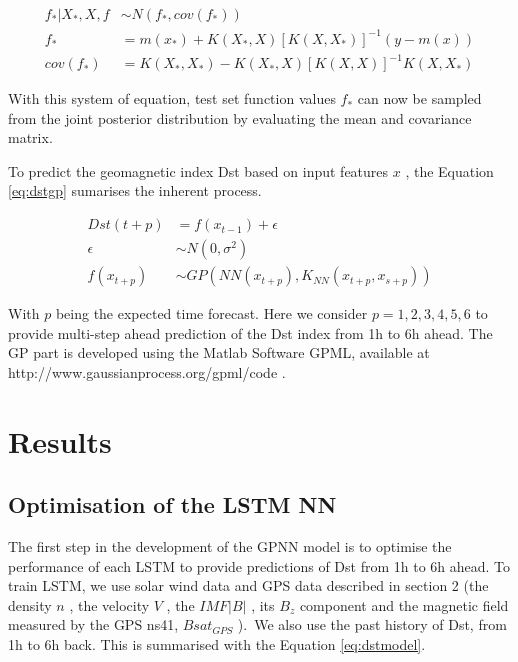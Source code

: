 \begin{align}\label{eq:preddist}
 f_{\ast} \vert X_{\ast},X,f &\sim N \left( f_{\ast},cov \left( f_{\ast} \right)  \right)  \\ 
 f_{\ast} &= m \left( x_{\ast} \right) +K \left( X_{\ast},X \right)  \left[ K \left( X,X_{\ast}  \right)  \right] ^{-1} \left( y-m \left( x \right)  \right) \\ 
 cov \left( f_{\ast} \right) &= K \left( X_{\ast},X_{\ast} \right) -K \left( X_{\ast},X \right)  \left[ K \left( X,X \right)  \right] ^{-1} K \left( X,X_{\ast} \right) 
\end{align}

With this system of equation, test set function values  \( f_{\ast} \)  can now be sampled from the joint 
posterior distribution by evaluating the mean and covariance matrix. 



To predict the geomagnetic index Dst based on input features \( x \) , the Equation \ref{eq:dstgp} sumarises 
the inherent process. 



\begin{align}\label{eq:dstgp}
Dst \left( t+p \right) &= f \left( x_{t-1} \right) + \epsilon \\ 
\epsilon &\sim N \left( 0, \sigma ^{2} \right)  \\
f \left( x_{t+p} \right)  &\sim GP \left( NN \left( x_{t+p} \right) , K_{NN}(x_{t+p}, x_{s+p} ) \right)
\end{align}

With  \( p \)  being the expected time forecast. Here we 
consider $p  = {1,2,3,4,5,6}$ to provide multi-step ahead prediction 
of the Dst index from 1h to 6h ahead. The GP part is developed using the Matlab Software GPML, available 
at http://www.gaussianprocess.org/gpml/code \cite{rasmussen2010gaussian}.




\section{Results}


\subsection{Optimisation of the LSTM NN}


The first step in the development of the GPNN model is to optimise the performance of each 
LSTM to provide predictions of Dst from 1h to 6h ahead. To train LSTM, we use solar wind data and 
GPS data described in section 2 (the density \(  n \) , the velocity  \( V \) , the  
\( IMF  \vert B \vert  \) , its  \( B_{z} \)  component and the magnetic field measured 
by the GPS ns41,  \( Bsat_{GPS} \) ).\ We also use the past history of Dst, from 1h  to 6h back. 
This is summarised with the Equation \ref{eq:dstmodel}.



